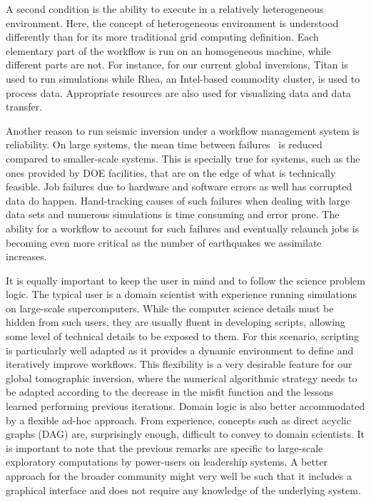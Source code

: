 A second condition is the ability to execute in a relatively heterogeneous
environment. Here, the concept of heterogeneous environment is understood
differently than for its more traditional grid computing definition. Each
elementary part of the workflow is run on an homogeneous machine, while different
parts are not. For instance, for our current global inversions, Titan is used
to run simulations while Rhea, an Intel-based commodity cluster, is used to
process data. Appropriate resources are also used for visualizing data and
data transfer.

Another reason to run seismic inversion under a workflow management system is
reliability. On large systems, the mean time between
failures~\cite{Cappello01112009} is reduced compared to smaller-scale systems.
This is specially true for systems, such as the ones provided by DOE facilities,
that are on the edge of what is technically feasible. Job failures due to
hardware and software errors as well has corrupted data do happen. Hand-tracking
causes of such failures when dealing with large data sets and numerous simulations
is time consuming and error prone. The ability for a workflow to account for
such failures and eventually relaunch jobs is becoming even more critical as 
the number of earthquakes we assimilate increases.

It is equally important to keep the user in mind and to follow the science
problem logic. The typical user is a domain scientist with experience running
simulations on large-scale supercomputers. While the computer science details
must be hidden from such users, they are usually fluent in developing scripts,
allowing some level of technical details to be exposed to them.
For this scenario, scripting is particularly well adapted as it provides a
dynamic environment to define and iteratively improve workflows. This
flexibility is a very desirable feature for our global tomographic inversion, where
the numerical algorithmic strategy needs to be adapted according to the decrease
in the misfit function and the lessons learned performing previous iterations.
Domain logic is also better accommodated by a flexible ad-hoc approach. From
experience, concepts such as direct acyclic graphs (DAG) are, surprisingly
enough, difficult to convey to domain scientists.
It is important to note that the previous remarks are specific to large-scale
exploratory computations by power-users on leadership systems. A better approach
for the broader community might very well be such that it includes a graphical
interface and does not require any knowledge of the underlying system.

